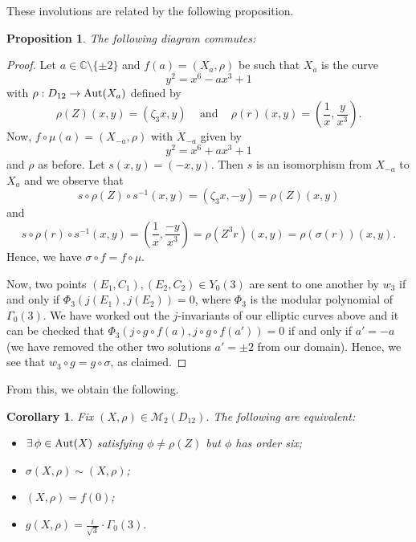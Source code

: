 \documentclass[a4paper,11pt]{amsart}
\numberwithin{equation}{section}
\numberwithin{figure}{section}
\numberwithin{table}{section}
\newtheorem{corollary}[theorem]{Corollary}
\newtheorem{proposition}[theorem]{Proposition}
\newcommand{\C}{\mathbb{C}}
\DeclareMathOperator{\Aut}{{\rm{Aut}}}
\begin{document}
These involutions are related by the following proposition.

\begin{proposition}
    The following diagram commutes:
    \begin{center}
    \end{center}
\end{proposition}

\begin{proof}
    Let $a\in\C\setminus\{\pm 2\}$ and $f(a) = (X_{a},\rho)$ be such that $X_{a}$ is the curve
    \[y^2 = x^6-ax^3+1\]
    with $\rho:D_{12}\to\Aut(X_{a})$ defined by
    \[\rho(Z)(x,y) = (\zeta_{3}x,y)\,\,\,\,\,\,\,\text{and}\,\,\,\,\,\,\,\rho(r)(x,y) = \left(\frac{1}{x},\frac{y}{x^3}\right).\]
    Now, $f\circ\mu(a) = (X_{-a},\rho)$ with $X_{-a}$ given by
    \[y^2 = x^6+ax^3+1\]
    and $\rho$ as before.
    Let $s(x,y) = (-x,y)$. Then $s$ is an isomorphism from $X_{-a}$ to $X_{a}$ and we observe that
    \[s\circ\rho(Z)\circ s^{-1} (x,y) = (\zeta_{3}x,-y) = \rho(Z)(x,y)\]
    and
    \[s\circ\rho(r)\circ s^{-1}(x,y) = \left(\frac{1}{x},\frac{-y}{x^3}\right) = \rho(Z^3r)(x,y) = \rho(\sigma(r))(x,y).\]
    Hence, we have $\sigma\circ f= f\circ\mu$.

    Now, two points $(E_1,C_1), (E_2,C_2)\in Y_{0}(3)$ are sent to one another by $w_{3}$ if and only if $\Phi_{3}(j(E_1),j(E_2)) = 0$, where $\Phi_{3}$ is the modular polynomial of $\Gamma_{0}(3)$. We have worked out the $j$-invariants of our elliptic curves above and it can be checked that $\Phi_{3}(j\circ g\circ f(a),j\circ g\circ f(a')) = 0$ if and only if $a' = -a$ (we have removed the other two solutions $a'=\pm 2$ from our domain). Hence, we see that $w_{3}\circ g = g\circ \sigma$, as claimed.
\end{proof}

From this, we obtain the following.

\begin{corollary}
    Fix $(X,\rho)\in\mathcal{M}_{2}(D_{12})$. The following are equivalent:
    \begin{itemize}
        \item $\exists\,\phi\in\Aut(X)$ satisfying $\phi\neq\rho(Z)$ but $\phi$ has order six;
        \item $\sigma(X,\rho)\sim(X,\rho)$;
        \item $(X,\rho) = f(0)$;
        \item $g(X,\rho) = \frac{i}{\sqrt{3}}\cdot\Gamma_{0}(3).$
    \end{itemize}
\end{corollary}
\end{document}
